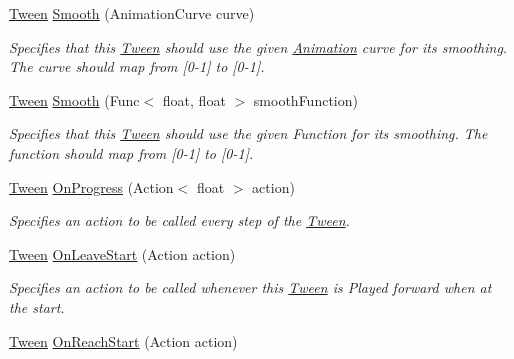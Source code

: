 \begin{DoxyCompactItemize}
\mbox{\hyperlink{struct_leap_1_1_unity_1_1_animation_1_1_tween}{Tween}} \mbox{\hyperlink{struct_leap_1_1_unity_1_1_animation_1_1_tween_ae1929c2f7f8dc7636e16d54b67d75337}{Smooth}} (Animation\+Curve curve)
\begin{DoxyCompactList}\small\item\em Specifies that this \mbox{\hyperlink{struct_leap_1_1_unity_1_1_animation_1_1_tween}{Tween}} should use the given \mbox{\hyperlink{namespace_leap_1_1_unity_1_1_animation}{Animation}} curve for its smoothing. The curve should map from \mbox{[}0-\/1\mbox{]} to \mbox{[}0-\/1\mbox{]}. \end{DoxyCompactList}\item 
\mbox{\hyperlink{struct_leap_1_1_unity_1_1_animation_1_1_tween}{Tween}} \mbox{\hyperlink{struct_leap_1_1_unity_1_1_animation_1_1_tween_a27b1991777c67934e885c0d01c64d031}{Smooth}} (Func$<$ float, float $>$ smooth\+Function)
\begin{DoxyCompactList}\small\item\em Specifies that this \mbox{\hyperlink{struct_leap_1_1_unity_1_1_animation_1_1_tween}{Tween}} should use the given Function for its smoothing. The function should map from \mbox{[}0-\/1\mbox{]} to \mbox{[}0-\/1\mbox{]}. \end{DoxyCompactList}\item 
\mbox{\hyperlink{struct_leap_1_1_unity_1_1_animation_1_1_tween}{Tween}} \mbox{\hyperlink{struct_leap_1_1_unity_1_1_animation_1_1_tween_a2f1e2df07793b5a7c397184cedeaca02}{On\+Progress}} (Action$<$ float $>$ action)
\begin{DoxyCompactList}\small\item\em Specifies an action to be called every step of the \mbox{\hyperlink{struct_leap_1_1_unity_1_1_animation_1_1_tween}{Tween}}. \end{DoxyCompactList}\item 
\mbox{\hyperlink{struct_leap_1_1_unity_1_1_animation_1_1_tween}{Tween}} \mbox{\hyperlink{struct_leap_1_1_unity_1_1_animation_1_1_tween_a6aa4eb20bcc8295adee7afc50e8fe731}{On\+Leave\+Start}} (Action action)
\begin{DoxyCompactList}\small\item\em Specifies an action to be called whenever this \mbox{\hyperlink{struct_leap_1_1_unity_1_1_animation_1_1_tween}{Tween}} is Played forward when at the start. \end{DoxyCompactList}\item 
\mbox{\hyperlink{struct_leap_1_1_unity_1_1_animation_1_1_tween}{Tween}} \mbox{\hyperlink{struct_leap_1_1_unity_1_1_animation_1_1_tween_af996cdf4236de2395c88bd0ba0fe65fb}{On\+Reach\+Start}} (Action action)

\end{DoxyCompactItemize}
